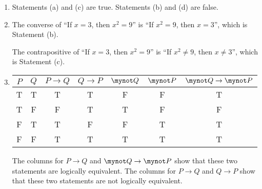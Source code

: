 \begin{enumerate}
\item Statements (a) and (c) are true.  Statements (b) and (d) are false.

\item The converse of ``If $x=3$, then $x^2 = 9$'' is ``If $x^2=9$, then $x=3$'', which is Statement (b).

The contrapositive of ``If $x=3$, then $x^2 = 9$'' is ``If  $x^2 \ne 9$, then $x \ne 3$'', which is Statement (c).

\item
\begin{tabular}[t]{| c | c || c | c | c | c | c |}  \hline
$P$  &  $Q$  &  $P \to Q$  &  $Q \to P$  &  $\mynot Q$  &  $\mynot P$  &  
$\mynot  Q \to\mynot  P$ \\ \hline
T  &  T  &  T  &  T  &  F  &  F  &  T  \\ \hline
T  &  F  &  F  &  T  &  T  &  F  &  F  \\ \hline
F  &  T  &  T  &  F  &  F  &  T  &  T  \\ \hline
F  &  F  &  T  &  T  &  T  &  T  &  T  \\ \hline
\end{tabular}

The columns for $P \to Q$ and $\mynot  Q \to\mynot  P$ show that these two statements are logically equivalent.  The columns for $P \to Q$ and $Q \to P$ show that these two statements are not logically equivalent.
\end{enumerate}
\hbreak

\newpage

\endinput
